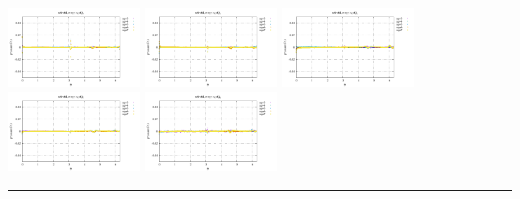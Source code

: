 \noindent
\includegraphics[width=3.5cm]{python_codes/fieldstone_152/RESULTS/exp1_2D/qqq_128_m2}
\includegraphics[width=3.5cm]{python_codes/fieldstone_152/RESULTS/exp1_2D/qqq_128_m3}
\includegraphics[width=3.5cm]{python_codes/fieldstone_152/RESULTS/exp1_2D/qqq_128_m4}
\includegraphics[width=3.5cm]{python_codes/fieldstone_152/RESULTS/exp1_2D/qqq_128_m5}
\includegraphics[width=3.5cm]{python_codes/fieldstone_152/RESULTS/exp1_2D/qqq_128_m6}

\hrule

